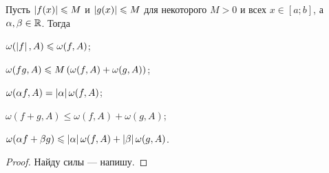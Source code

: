 \begin{proposal}
    Пусть $\left\lvert f(x)\right\rvert \leqslant M$ и $\left\lvert g(x)\right\rvert \leqslant M$ для некоторого $M > 0$ и всех $x \in [a; b]$, а $\alpha, \beta \in \mathbb{R}$. Тогда
    \begin{enumerate}
        \begin{minipage}{.5\textwidth}
            \item $\omega(\left\lvert f\right\rvert, A) \leqslant \omega(f, A)$;
            \item $\omega(fg, A) \leqslant M\left(\omega(f, A) + \omega(g, A)\right)$;
            \item $\omega(\alpha f, A) = \left\lvert\alpha\right\rvert\omega(f, A)$;
        \end{minipage}
        \begin{minipage}[b]{.5\textwidth}
            \item $\omega(f + g, A) \leqslant \omega(f, A) + \omega(g, A)$;
            \item $\omega(\alpha f + \beta g) \leqslant \left\lvert\alpha\right\rvert\omega(f, A) + \left\lvert\beta\right\rvert\omega(g, A)$.
        \end{minipage}
    \end{enumerate}
\end{proposal}

\begin{proof}
    Найду силы --- напишу.
\end{proof}


